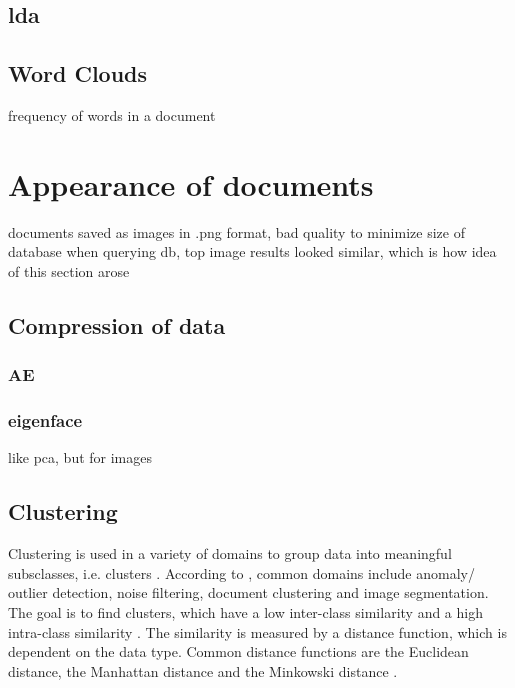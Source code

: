 \subsection{\ac{lda}}\label{subsec:latent-dirichlet-allocation}

\subsection{Word Clouds}\label{subsec:word-clouds}
frequency of words in a document


\section{Appearance of documents}\label{sec:appearance}
documents saved as images in .png format, bad quality to minimize size of database
when querying db, top image results looked similar, which is how idea of this section arose

\subsection{Compression of data}\label{subsec:compression}
\subsubsection{AE}\label{subsec:autoencoder}

\subsubsection{eigenface}\label{subsec:eigenface}
like pca, but for images


\subsection{Clustering}\label{subsec:clustering}

Clustering is used in a variety of domains to group data into meaningful subsclasses, i.e. clusters \cite{OPTICS2013, OPTICS2014, OPTICS_kMeans_2016}.
According to \citeauthor{OPTICS2013}, common domains include anomaly/ outlier detection, noise filtering, document clustering and image segmentation. 
The goal is to find clusters, which have a low inter-class similarity and a high intra-class similarity \cite{OPTICS2013}.
The similarity is measured by a distance function, which is dependent on the data type. 
Common distance functions are the Euclidean distance, the Manhattan distance and the Minkowski distance \cite{OPTICS_kMeans_2016}.

